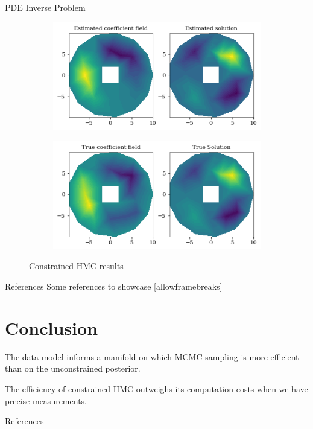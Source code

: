 \documentclass[10pt]{beamer}
\begin{document}
\begin{frame}[fragile]{PDE Inverse Problem}
       \begin{figure}
       
        \begin{subfigure}[b]{0.42\textwidth}
            \includegraphics[width=\textwidth]{pde_estimate.png}
        \end{subfigure}%
        \qquad \qquad
        \begin{subfigure}[b]{0.42\textwidth}
            \includegraphics[width=\textwidth]{pde_true.png}
        \end{subfigure}
        \caption{Constrained HMC results}
    \end{figure}
\end{frame}

\begin{frame}{References}
  Some references to showcase [allowframebreaks] \cite{knuth92,ConcreteMath,Simpson,Er01,greenwade93}
\end{frame}

\section{Conclusion}
\begin{frame}[fragile]
The data model informs a manifold on which MCMC sampling is more efficient than on the unconstrained posterior.

The efficiency of constrained HMC outweighs its computation costs when we have precise measurements.
\end{frame}


\begin{frame}[allowframebreaks]{References}

  
  

\end{frame}
\end{document}
